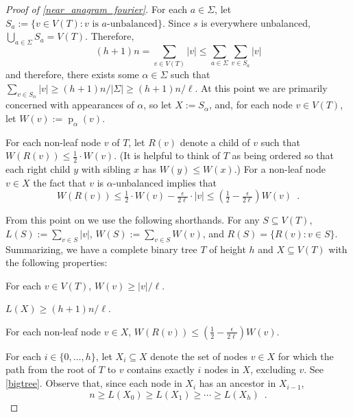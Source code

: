\documentclass{patmorin}
\DeclareMathOperator{\hist}{p}
\begin{document}
\begin{proof}[Proof of \cref{near_anagram_fourier}]
  For each $a\in\Sigma$, let $S_a:=\{v\in V(T): \text{$v$ is $a$-unbalanced}\}$. Since $s$ is everywhere unbalanced, $\bigcup_{a\in\Sigma} S_a=V(T)$. Therefore,
  \[
     (h+1)n = \sum_{v\in V(T)}|v|\le \sum_{a\in\Sigma} \sum_{v\in S_a} |v|
  \]
  and therefore, there exists some $\alpha\in\Sigma$ such that $\sum_{v\in S_{\alpha}}|v|\ge (h+1)n/|\Sigma| \ge (h+1)n/\ell$.   At this point we are primarily concerned with appearances of $\alpha$, so let $X:=S_{\alpha}$, and, for each node $v\in V(T)$, let $W(v):=\hist_{\alpha}(v)$.

  For each non-leaf node $v$ of $T$, let $R(v)$ denote a child of $v$ such that $W(R(v))\le \tfrac12\cdot W(v)$.  (It is helpful to think of $T$ as being ordered so that each right child $y$ with sibling $x$ has $W(y)\le W(x)$.)  For a non-leaf node $v\in X$ the fact that $v$ is $\alpha$-unbalanced implies that
  \[  W(R(v)) \le \tfrac{1}{2}\cdot W(v) - \tfrac{\epsilon}{2\ell}\cdot |v|
      \le (\tfrac12-\tfrac{\epsilon}{2\ell})W(v) \enspace .
  \]

  From this point on we use the following shorthands. For any $S\subseteq V(T)$, $L(S):=\sum_{v\in S}|v|$,
  $W(S):=\sum_{v\in S}W(v)$, and $R(S)=\{R(v):v\in S\}$.  Summarizing, we have a complete binary tree $T$ of height $h$ and
  $X\subseteq V(T)$ with the following properties:
  \begin{compactenum}
    \item For each $v\in V(T)$,  $W(v)\ge |v|/\ell$.
    \item $L(X) \ge (h+1)n/\ell$.
    \item For each non-leaf node $v\in X$,
      $W(R(v)) \le (\tfrac{1}{2}-\tfrac{\epsilon}{2\ell})W(v)$.
  \end{compactenum}
  For each $i\in\{0,\ldots,h\}$, let $X_i\subseteq X$ denote the
  set of nodes $v\in X$ for which the path from the root of $T$ to $v$
  contains exactly $i$ nodes in $X$, excluding $v$.  See \cref{bigtree}. Observe that, since each node in $X_i$ has an ancestor in $X_{i-1}$,
  \[  n \ge L(X_0) \ge L(X_1) \ge \cdots\ge L(X_{h}) \enspace . \]


\end{proof}
\end{document}
